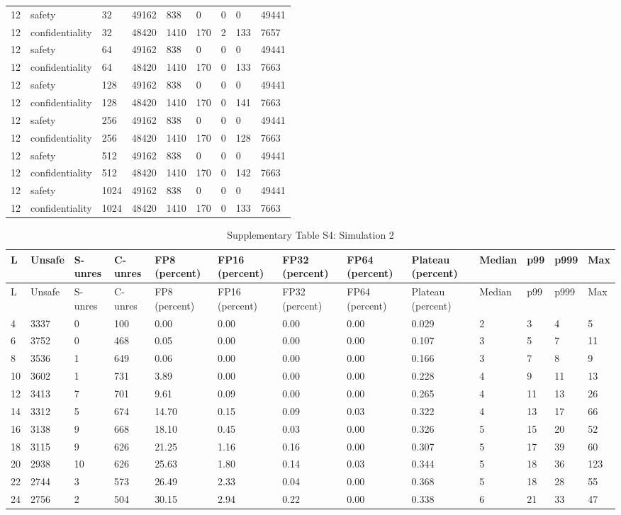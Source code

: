 \documentclass[10pt]{article}
\begin{document}
\begin{landscape}
\begin{longtable}{lllllllll}
12 & safety & 32 & 49162 & 838 & 0 & 0 & 0 & 49441\\
12 & confidentiality & 32 & 48420 & 1410 & 170 & 2 & 133 & 7657\\
12 & safety & 64 & 49162 & 838 & 0 & 0 & 0 & 49441\\
12 & confidentiality & 64 & 48420 & 1410 & 170 & 0 & 133 & 7663\\
12 & safety & 128 & 49162 & 838 & 0 & 0 & 0 & 49441\\
12 & confidentiality & 128 & 48420 & 1410 & 170 & 0 & 141 & 7663\\
12 & safety & 256 & 49162 & 838 & 0 & 0 & 0 & 49441\\
12 & confidentiality & 256 & 48420 & 1410 & 170 & 0 & 128 & 7663\\
12 & safety & 512 & 49162 & 838 & 0 & 0 & 0 & 49441\\
12 & confidentiality & 512 & 48420 & 1410 & 170 & 0 & 142 & 7663\\
12 & safety & 1024 & 49162 & 838 & 0 & 0 & 0 & 49441\\
12 & confidentiality & 1024 & 48420 & 1410 & 170 & 0 & 133 & 7663\\
\bottomrule\end{longtable}
\clearpage
\begin{longtable}{lllllllllllll}
\caption{Supplementary Table S4: Simulation 2}\\
\toprule
L & Unsafe & S-unres & C-unres & FP8 (percent) & FP16 (percent) & FP32 (percent) & FP64 (percent) & Plateau (percent) & Median & p99 & p999 & Max\\\midrule\endfirsthead
\toprule L & Unsafe & S-unres & C-unres & FP8 (percent) & FP16 (percent) & FP32 (percent) & FP64 (percent) & Plateau (percent) & Median & p99 & p999 & Max\\\midrule\endhead
4 & 3337 & 0 & 100 & 0.00 & 0.00 & 0.00 & 0.00 & 0.029 & 2 & 3 & 4 & 5\\
6 & 3752 & 0 & 468 & 0.05 & 0.00 & 0.00 & 0.00 & 0.107 & 3 & 5 & 7 & 11\\
8 & 3536 & 1 & 649 & 0.06 & 0.00 & 0.00 & 0.00 & 0.166 & 3 & 7 & 8 & 9\\
10 & 3602 & 1 & 731 & 3.89 & 0.00 & 0.00 & 0.00 & 0.228 & 4 & 9 & 11 & 13\\
12 & 3413 & 7 & 701 & 9.61 & 0.09 & 0.00 & 0.00 & 0.265 & 4 & 11 & 13 & 26\\
14 & 3312 & 5 & 674 & 14.70 & 0.15 & 0.09 & 0.03 & 0.322 & 4 & 13 & 17 & 66\\
16 & 3138 & 9 & 668 & 18.10 & 0.45 & 0.03 & 0.00 & 0.326 & 5 & 15 & 20 & 52\\
18 & 3115 & 9 & 626 & 21.25 & 1.16 & 0.16 & 0.00 & 0.307 & 5 & 17 & 39 & 60\\
20 & 2938 & 10 & 626 & 25.63 & 1.80 & 0.14 & 0.03 & 0.344 & 5 & 18 & 36 & 123\\
22 & 2744 & 3 & 573 & 26.49 & 2.33 & 0.04 & 0.00 & 0.368 & 5 & 18 & 28 & 55\\
24 & 2756 & 2 & 504 & 30.15 & 2.94 & 0.22 & 0.00 & 0.338 & 6 & 21 & 33 & 47\\
\bottomrule\end{longtable}
\clearpage
\end{landscape}
\end{document}

